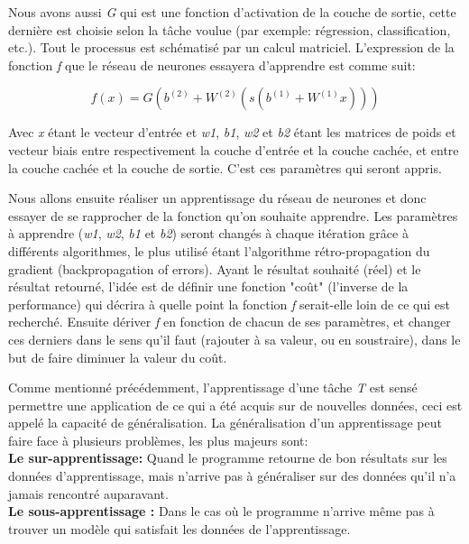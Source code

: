 	Nous avons aussi \textit{G} qui est une fonction d'activation de la couche de sortie, cette dernière est choisie selon la tâche voulue (par exemple: régression, classification, etc.).
Tout le processus est schématisé par un calcul matriciel. L’expression de la fonction \textit{f} que le réseau de neurones essayera d'apprendre est comme suit:

$$f(x) = G( b^{(2)} + W^{(2)}( s( b^{(1)} + W^{(1)} x)))$$

	Avec \textit{x} étant le vecteur d'entrée et \textit{w1}, \textit{ b1}, \textit{w2} et \textit{b2} étant les matrices de poids et vecteur biais entre respectivement la couche d'entrée et la couche cachée, et entre la couche cachée et la couche de sortie. C'est ces paramètres qui seront appris.
	
	Nous allons ensuite réaliser un apprentissage du réseau de neurones et donc essayer de se rapprocher de la fonction qu'on souhaite apprendre. Les paramètres à apprendre (\textit{w1}, \textit{ w2}, \textit{b1} et \textit{b2}) seront changés à chaque itération grâce à différents algorithmes, le plus utilisé étant l'algorithme rétro-propagation du gradient (backpropagation of errors). 
	Ayant le résultat souhaité (réel) et le résultat retourné, l'idée est de définir une fonction "coût" (l'inverse de la performance) qui décrira à quelle point la fonction \textit{f} serait-elle loin de ce qui est recherché. Ensuite dériver \textit{f} en fonction de chacun de ses paramètres, et changer ces derniers dans le sens qu'il faut (rajouter à sa valeur, ou en soustraire), dans le but de faire diminuer la valeur du coût.

	Comme mentionné précédemment, l'apprentissage d'une tâche \textit{T} est sensé permettre une application de ce qui a été acquis sur de nouvelles données, ceci est appelé la capacité de généralisation. La généralisation d'un apprentissage peut faire face à plusieurs problèmes, les plus majeurs sont:\\

\textbf{Le sur-apprentissage:} Quand le programme retourne de bon résultats sur les données d'apprentissage, mais n'arrive pas à généraliser sur des données qu'il n'a jamais rencontré auparavant.\\

\textbf{Le sous-apprentissage :} Dans le cas où le programme n'arrive même pas à trouver un modèle qui satisfait les données de l'apprentissage.\\


